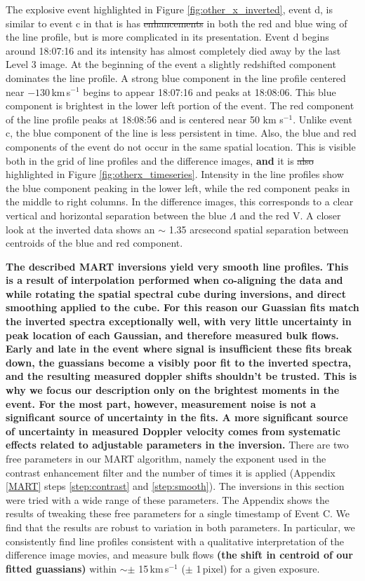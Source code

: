 		The explosive event highlighted in Figure \ref{fig:other_x_inverted}, event d, is similar to event c in that is has \sout{enhancements} \textbf{} in both the red and blue wing of the line profile, but is more complicated in its presentation.
		Event d  begins around 18:07:16 and its intensity has almost completely died away by the last Level 3 image.
		At the beginning of the event a slightly redshifted component dominates the line profile.
		A strong blue component in the line profile centered near $-130$\,km\,s$^{-1}$ begins to appear 18:07:16 and peaks at 18:08:06. 
		This blue component is brightest in the lower left portion of the event.
		The red component of the line profile peaks at 18:08:56 and is centered near 50 km s$^{-1}$.
		Unlike event c, the blue component of the line is less persistent in time.
		Also, the blue and red components of the event do not occur in the same spatial location.
		This is visible both in the grid of line profiles and the difference images, \textbf{and} it is \sout{also} highlighted in Figure \ref{fig:otherx_timeseries}.
		Intensity in the line profiles show the blue component peaking in the lower left, while the red component peaks in the middle to right columns.
		In the difference images, this corresponds to a clear vertical and horizontal separation between the blue $\Lambda$ and the red V. 
		A closer look at the inverted data shows an $\sim$ 1.35 arcsecond spatial separation between centroids of the blue and red component.
	    
	    \textbf{The described MART inversions yield very smooth line profiles.
	    This is a result of interpolation performed when co-aligning the data and while rotating the spatial spectral cube during inversions, and direct smoothing applied to the cube.
	    For this reason our Guassian fits match the inverted spectra exceptionally well, with very little uncertainty in peak location of each Gaussian, and therefore measured bulk flows.
	    Early and late in the event where signal is insufficient these fits break down, the guassians become a visibly poor fit to the inverted spectra, and the resulting measured doppler shifts shouldn't be trusted.
	    This is why we focus our description only on the brightest moments in the event. For the most part, however, measurement noise is not a significant source of  uncertainty in the fits.
	    A more significant source of uncertainty in measured Doppler velocity comes from systematic effects related to adjustable parameters in the inversion.}		   	
        There are two free parameters in our MART algorithm, namely the exponent used in the contrast enhancement filter and the number of times it is applied (Appendix \ref{MART} steps \ref{step:contrast} and \ref{step:smooth}). The inversions in this section were tried with a wide range of these parameters. 
        The Appendix shows the results of tweaking these free parameters for a single timestamp of Event C.
        We find that the results are robust to variation in both parameters. 
        In particular, we consistently find line profiles consistent with a qualitative interpretation of the difference image movies, and measure bulk flows \textbf{(the shift in centroid of our fitted guassians)} within $\sim\pm$ 15\,km\,s$^{-1}$ ($\pm$ 1\,pixel) for a given exposure. 
    

